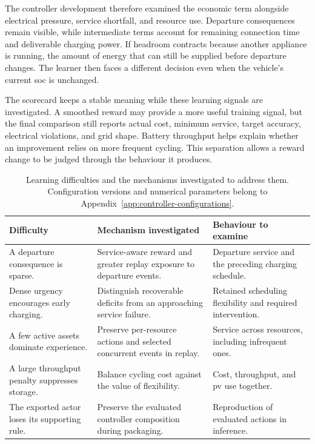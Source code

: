 The controller development therefore examined the economic term alongside electrical pressure, service shortfall, and resource use. Departure consequences remain visible, while intermediate terms account for remaining connection time and deliverable charging power. If headroom contracts because another appliance is running, the amount of energy that can still be supplied before departure changes. The learner then faces a different decision even when the vehicle's current \gls{soc} is unchanged.

The scorecard keeps a stable meaning while these learning signals are investigated. A smoothed reward may provide a more useful training signal, but the final comparison still reports actual cost, minimum service, target accuracy, electrical violations, and grid shape. Battery throughput helps explain whether an improvement relies on more frequent cycling. This separation allows a reward change to be judged through the behaviour it produces.

\begin{table}[htbp]
\centering
\caption{Learning difficulties and the mechanisms investigated to address them. Configuration versions and numerical parameters belong to Appendix~\ref{app:controller-configurations}.}
\label{tab:control-reward-lineage}
\small
\begin{tabularx}{\textwidth}{@{}p{}XX@{}}
\toprule
\textbf{Difficulty} & \textbf{Mechanism investigated} & \textbf{Behaviour to examine}\\
\midrule
A departure consequence is sparse. & Service-aware reward and greater replay exposure to departure events. & Departure service and the preceding charging schedule.\\
\addlinespace
Dense urgency encourages early charging. & Distinguish recoverable deficits from an approaching service failure. & Retained scheduling flexibility and required intervention.\\
\addlinespace
A few active assets dominate experience. & Preserve per-resource actions and selected concurrent events in replay. & Service across resources, including infrequent ones.\\
\addlinespace
A large throughput penalty suppresses storage. & Balance cycling cost against the value of flexibility. & Cost, throughput, and \gls{pv} use together.\\
\addlinespace
The exported actor loses its supporting rule. & Preserve the evaluated controller composition during packaging. & Reproduction of evaluated actions in inference.\\
\bottomrule
\end{tabularx}
\end{table}

